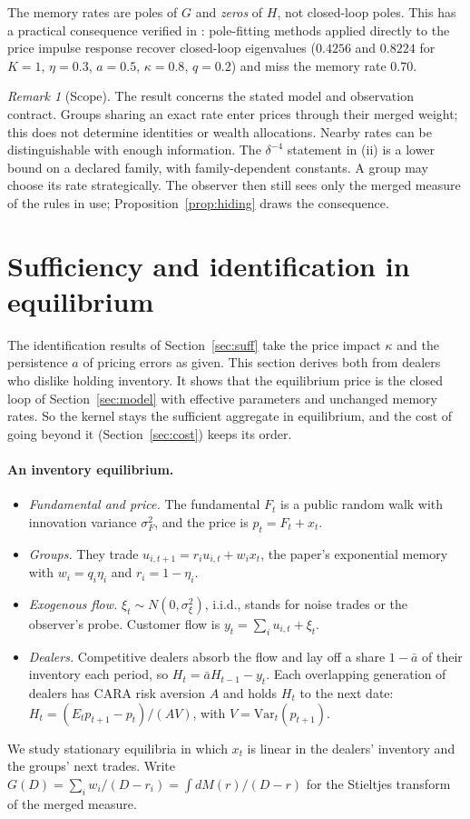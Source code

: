 \documentclass[12pt]{article}
\theoremstyle{definition}
\theoremstyle{remark}
\newtheorem{remark}[theorem]{Remark}
\begin{document}
The memory rates are poles of $G$ and \emph{zeros} of $H$, not closed-loop poles. This has a practical consequence verified in \citet{niroula2026a}: pole-fitting methods applied directly to the price impulse response recover closed-loop eigenvalues ($0.4256$ and $0.8224$ for $K=1$, $\eta=0.3$, $a=0.5$, $\kappa=0.8$, $q=0.2$) and miss the memory rate $0.70$.
\begin{remark}[Scope]\label{rem:scope}
The result concerns the stated model and observation contract. Groups sharing an exact rate enter prices through their merged weight; this does not determine identities or wealth allocations. Nearby rates can be distinguishable with enough information. The $\delta^{-4}$ statement in (ii) is a lower bound on a declared family, with family-dependent constants. A group may choose its rate strategically. The observer then still sees only the merged measure of the rules in use; Proposition~\ref{prop:hiding} draws the consequence.
\end{remark}
\section{Sufficiency and identification in equilibrium}\label{sec:equilibrium}

The identification results of Section~\ref{sec:suff} take the price impact $\kappa$ and the persistence $a$ of pricing errors as given. This section derives both from dealers who dislike holding inventory. It shows that the equilibrium price is the closed loop of Section~\ref{sec:model} with effective parameters and unchanged memory rates. So the kernel stays the sufficient aggregate in equilibrium, and the cost of going beyond it (Section~\ref{sec:cost}) keeps its order.


\paragraph{An inventory equilibrium.}
\begin{itemize}[itemsep=1pt,topsep=2pt]
\item \emph{Fundamental and price.} The fundamental $F_t$ is a public random walk with innovation variance $\sigma_F^2$, and the price is $p_t=F_t+x_t$.
\item \emph{Groups.} They trade $u_{i,t+1}=r_iu_{i,t}+w_ix_t$, the paper's exponential memory with $w_i=q_i\eta_i$ and $r_i=1-\eta_i$.
\item \emph{Exogenous flow.} $\xi_t\sim N(0,\sigma_\xi^2)$, i.i.d., stands for noise trades or the observer's probe. Customer flow is $y_t=\sum_iu_{i,t}+\xi_t$.
\item \emph{Dealers.} Competitive dealers absorb the flow and lay off a share $1-\bar a$ of their inventory each period, so $H_t=\bar aH_{t-1}-y_t$. Each overlapping generation of dealers has CARA risk aversion $A$ and holds $H_t$ to the next date: $H_t=(E_tp_{t+1}-p_t)/(AV)$, with $V=\mathrm{Var}_t(p_{t+1})$.
\end{itemize}
We study stationary equilibria in which $x_t$ is linear in the dealers' inventory and the groups' next trades. Write $G(D)=\sum_iw_i/(D-r_i)=\int dM(r)/(D-r)$ for the Stieltjes transform of the merged measure.
\end{document}
